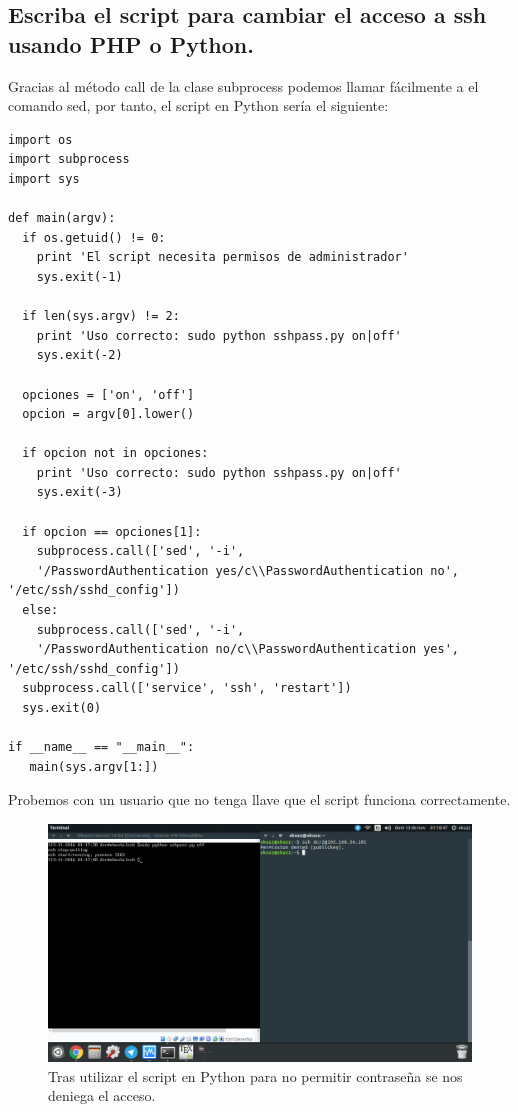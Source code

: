 \begin{flushleft}
\section{Escriba el script para cambiar el acceso a ssh usando PHP o Python.}
Gracias al método call de la clase subprocess \cite{c16} podemos llamar fácilmente a el comando sed, por tanto,
el script en Python sería el siguiente:
\begin{verbatim}
import os
import subprocess
import sys

def main(argv):
  if os.getuid() != 0:
    print 'El script necesita permisos de administrador'
    sys.exit(-1)

  if len(sys.argv) != 2:
    print 'Uso correcto: sudo python sshpass.py on|off'
    sys.exit(-2)

  opciones = ['on', 'off']
  opcion = argv[0].lower()

  if opcion not in opciones:
    print 'Uso correcto: sudo python sshpass.py on|off'
    sys.exit(-3) 

  if opcion == opciones[1]:
    subprocess.call(['sed', '-i', 
    '/PasswordAuthentication yes/c\\PasswordAuthentication no', '/etc/ssh/sshd_config'])
  else:
    subprocess.call(['sed', '-i', 
    '/PasswordAuthentication no/c\\PasswordAuthentication yes', '/etc/ssh/sshd_config'])
  subprocess.call(['service', 'ssh', 'restart'])
  sys.exit(0)

if __name__ == "__main__":
   main(sys.argv[1:])
\end{verbatim}

Probemos con un usuario que no tenga llave que el script funciona correctamente.

\begin{figure}[H]
	\centering
	\includegraphics[scale=0.3]{pyoff.png}
	\caption{Tras utilizar el script en Python para no permitir contraseña se nos deniega el acceso.}
\end{figure}


\end{flushleft}
